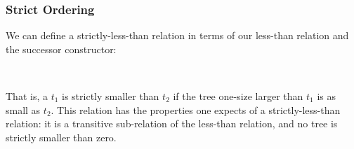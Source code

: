 \subsubsection{Strict Ordering}

We can define a strictly-less-than relation in terms of our less-than relation
and the successor constructor:
\begin{code}%
%
\>[4]\AgdaOperator{\AgdaFunction{\AgdaUnderscore{}<\AgdaUnderscore{}}}\AgdaSpace{}%
\AgdaSymbol{:}\AgdaSpace{}%
\AgdaSpace{}%
\AgdaSpace{}%
\AgdaSpace{}%
\AgdaSpace{}%
\AgdaSpace{}%
\<%
\\
%
\>[4]\AgdaSpace{}%
\AgdaOperator{\AgdaFunction{<}}\AgdaSpace{}%
\AgdaSpace{}%
\AgdaSymbol{=}\AgdaSpace{}%
\AgdaSpace{}%
\AgdaSpace{}%
\AgdaSpace{}%
\<%
\end{code}

  That is, a $t_{1}$ is strictly smaller than $t_{2}$ if the tree one-size larger than $t_{1}$ is as small as $t_{2}$.
  This relation has the properties one expects of a strictly-less-than
  relation: it is a transitive  sub-relation of the less-than relation,
  and no tree is strictly smaller than zero.

